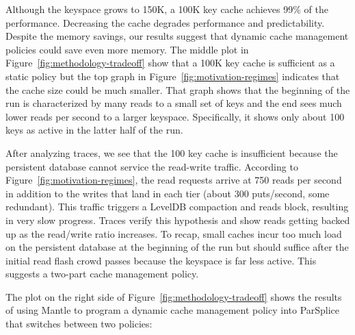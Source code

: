 Although the keyspace grows to 150K, a 100K key cache achieves 99\% of the
performance. Decreasing the cache degrades performance and predictability.
Despite the memory savings, our results suggest that dynamic cache management
policies could save even more memory.  The middle plot in
Figure~\ref{fig:methodology-tradeoff} show that a 100K key cache is sufficient
as a static policy but the top graph in Figure~\ref{fig:motivation-regimes}
indicates that the cache size could be much smaller. That graph shows that the
beginning of the run is characterized by many reads to a small set of keys and
the end sees much lower reads per second to a larger keyspace. Specifically, it
shows only about 100 keys as active in the latter half of the run.

After analyzing traces, we see that the 100 key cache is insufficient because
the persistent database cannot service the read-write traffic.  According to
Figure~\ref{fig:motivation-regimes}, the read requests arrive at 750 reads per
second in addition to the writes that land in each tier (about 300 puts/second,
some redundant). This traffic triggers a LevelDB compaction and reads block,
resulting in very slow progress.  Traces verify this hypothesis and show reads
getting backed up as the read/write ratio increases. To recap, small caches
incur too much load on the persistent database  at the beginning of the run but
should suffice after the initial read flash crowd passes because
the keyspace is far less active. This suggests a two-part cache management
policy.


The plot on the right side of Figure~\ref{fig:methodology-tradeoff} shows the results of using Mantle
to program a dynamic cache management policy into ParSplice that switches between
two policies:

